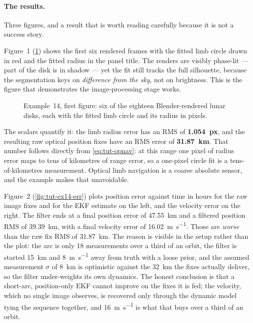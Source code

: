 \paragraph{The results.}
Three figures, and a result that is worth reading carefully because it is not a
success story.

Figure~1 (\cref{fig:tut-ex14-limb}) shows the first six rendered frames with the
fitted limb circle drawn in red and the fitted radius in the panel title. The
renders are visibly phase-lit --- part of the disk is in shadow --- yet the fit
still tracks the full silhouette, because the segmentation keys on
\emph{difference from the sky}, not on brightness. This is the figure that
demonstrates the image-processing stage works.

\begin{figure}[htbp]
  \centering
  \caption{Example~14, first figure: six of the eighteen Blender-rendered lunar
           disks, each with the fitted limb circle and its radius in pixels.}
  \label{fig:tut-ex14-limb}
\end{figure}

The scalars quantify it: the limb radius error has an RMS of
\textbf{\SI{1.054}{px}}, and the resulting raw optical position fixes have an
RMS error of \textbf{\SI{31.87}{\kilo\meter}}. That number follows directly from
\cref{eq:tut-opnav}: at this range one pixel of radius error maps to tens of
kilometres of range error, so a one-pixel circle fit is a tens-of-kilometres
measurement. Optical limb navigation is a coarse absolute sensor, and the
example makes that unavoidable.

Figure~2 (\cref{fig:tut-ex14-err}) plots position error against time in hours
for the raw image fixes and for the EKF estimate on the left, and the velocity
error on the right. The filter ends at a final position error of
\SI{47.55}{\kilo\meter} and a filtered position RMS of
\SI{39.39}{\kilo\meter}, with a final velocity error of
\SI{16.02}{\meter\per\second}. Those are \emph{worse} than the raw fix RMS of
\SI{31.87}{\kilo\meter}. The reason is visible in the setup rather than the
plot: the arc is only 18 measurements over a third of an orbit, the filter is
started \SI{15}{\kilo\meter} and \SI{8}{\meter\per\second} away from truth with
a loose prior, and the assumed measurement $\sigma$ of \SI{8}{\kilo\meter} is
optimistic against the \SI{32}{\kilo\meter} the fixes actually deliver, so the
filter under-weights its own dynamics. The honest conclusion is that a
short-arc, position-only EKF cannot improve on the fixes it is fed; the
velocity, which no single image observes, is recovered only through the dynamic
model tying the sequence together, and \SI{16}{\meter\per\second} is what that
buys over a third of an orbit.

